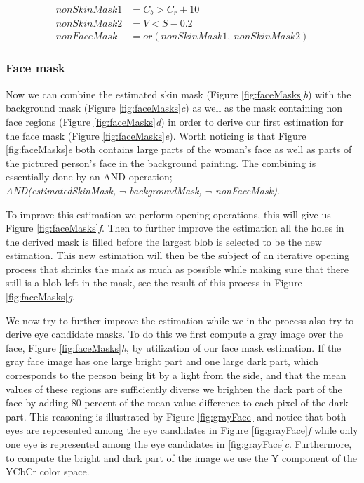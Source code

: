 \begin{equation} \label{eq:nonFaceMask}
\begin{split}
  nonSkinMask1 & = C_{b} > C_{r} + 10 \\
  nonSkinMask2 & = V < S - 0.2 \\
  nonFaceMask & = or(nonSkinMask1, \ nonSkinMask2)
\end{split}
\end{equation}

\subsubsection{Face mask}
Now we can combine the estimated skin mask (Figure \ref{fig:faceMasks}\textit{b}) with the background mask (Figure \ref{fig:faceMasks}\textit{c}) as well as the mask containing non face regions (Figure \ref{fig:faceMasks}\textit{d}) in order to derive our first estimation for the face mask (Figure \ref{fig:faceMasks}\textit{e}). Worth noticing is that Figure \ref{fig:faceMasks}\textit{e} both contains large parts of the woman's face as well as parts of the pictured person's face in the background painting. The combining is essentially done by an AND operation; \\ 
\-\hspace{1.0cm} \textit{AND(estimatedSkinMask, $\neg$ backgroundMask, $\neg$ nonFaceMask)}.

To improve this estimation we perform opening operations, this will give us Figure \ref{fig:faceMasks}\textit{f}. Then to further improve the estimation all the holes in the derived mask is filled before the largest blob is selected to be the new estimation. This new estimation will then be the subject of an iterative opening process that shrinks the mask as much as possible while making sure that there still is a blob left in the mask, see the result of this process in Figure \ref{fig:faceMasks}\textit{g}.

We now try to further improve the estimation while we in the process also try to derive eye candidate masks. To do this we first compute a gray image over the face, Figure \ref{fig:faceMasks}\textit{h}, by utilization of our face mask estimation. If the gray face image has one large bright part and one large dark part, which corresponds to the person being lit by a light from the side, and that the mean values of these regions are sufficiently diverse we brighten the dark part of the face by adding $80$ percent of the mean value difference to each pixel of the dark part. This reasoning is illustrated by Figure \ref{fig:grayFace} and notice that both eyes are represented among the eye candidates in Figure \ref{fig:grayFace}\textit{f} while only one eye is represented among the eye candidates in \ref{fig:grayFace}\textit{c}. Furthermore, to compute the bright and dark part of the image we use the Y component of the YCbCr color space. 

